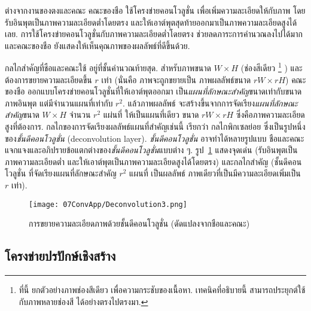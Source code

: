 ต่างจากงานของตงและคณะ\cite{DongEtAl2014} 
คณะของชือ\cite{ShiEtAl2016a, ShiEtAl2016}
ใช้โครงข่ายคอนโวลูชั่น เพื่อเพิ่มความละเอียดให้กับภาพ โดยรับอินพุตเป็นภาพความละเอียดต่ำโดยตรง
และให้เอาต์พุตสุดท้ายออกมาเป็นภาพความละเอียดสูงได้เลย.
การใช้โครงข่ายคอนโวลูชั่นกับภาพความละเอียดต่ำโดยตรง ช่วยลดภาระการคำนวณลงไปได้มาก
และคณะของชือ ยังแสดงให้เห็นคุณภาพของผลลัพธ์ที่ดีขึ้นด้วย.

กลไกสำคัญที่ชือและคณะใช้ อยู่ที่ชั้นคำนวณท้ายสุด.
สำหรับภาพขนาด $W \times H$ (ช่องสีเดียว%
\footnote{%
ที่นี้ ยกตัวอย่างภาพช่องสีเดียว เพื่อความกระชับของเนื้อหา.
เทคนิคที่อธิบายนี้ สามารถประยุกต์ใช้กับภาพหลายช่องสี ได้อย่างตรงไปตรงมา.
}%
)
และต้องการขยายความละเอียดขึ้น $r$ เท่า (นั่นคือ ภาพจะถูกขยายเป็น ภาพผลลัพธ์ขนาด $r W \times r H$)
คณะของชือ ออกแบบโครงข่ายคอนโวลูชั่นที่ให้เอาต์พุตออกมา 
เป็น\textit{แผนที่ลักษณะสำคัญ}ขนาดเท่ากับขนาดภาพอินพุต 
แต่มีจำนวนแผนที่เท่ากับ $r^2$. 
แล้วภาพผลลัพธ์ จะสร้างขึ้นจากการจัดเรียง\textit{แผนที่ลักษณะสำคัญ}ขนาด $W \times H$ จำนวน $r^2$ แผ่นที่
ให้เป็นแผนที่เดียว ขนาด $r W \times r H$ ซึ่งคือภาพความละเอียดสูงที่ต้องการ.
กลไกของการจัดเรียงผลลัพธ์แผนที่สำคัญเช่นนี้ เรียกว่า กลไกพิกเซลย่อย
ซึ่งเป็นรูปหนึ่งของ\textit{ชั้นดีคอนโวลูชั่น} (deconvolution layer\cite{ZeilerEtAl2010}).
\textit{ชั้นดีคอนโวลูชั่น} อาจทำได้หลายรูปแบบ
ชือและคณะ\cite{ShiEtAl2016} แจกแจงและอภิปรายข้อแตกต่างของ\textit{ชั้นดีคอนโวลูชั่น}แบบต่าง ๆ.
รูป~\ref{fig: conv app deconvolution} แสดงจุดเด่น (รับอินพุตเป็นภาพความละเอียดต่ำ และให้เอาต์พุตเป็นภาพความละเอียดสูงได้โดยตรง)
และกลไกสำคัญ (ชั้นดีคอนโวลูชั่น ที่จัดเรียงแผนที่ลักษณะสำคัญ $r^2$ แผนที่ เป็นผลลัพธ์ ภาพเดียวที่เป็นมีความละเอียดเพิ่มเป็น $r$ เท่า).


%
\begin{figure}
	\begin{center}
		\texttt{[image: 07ConvApp/Deconvolution3.png]}
		\caption[การขยายความละเอียดภาพด้วยชั้นดีคอนโวลูชั่น]{การขยายความละเอียดภาพด้วยชั้นดีคอนโวลูชั่น (ดัดแปลงจากชือและคณะ\cite{ShiEtAl2016a})}
		\label{fig: conv app deconvolution}
	\end{center}
\end{figure}
%
	
	
\subsection{โครงข่ายปรปักษ์เชิงสร้าง}
\label{sec: convapp GAN}


